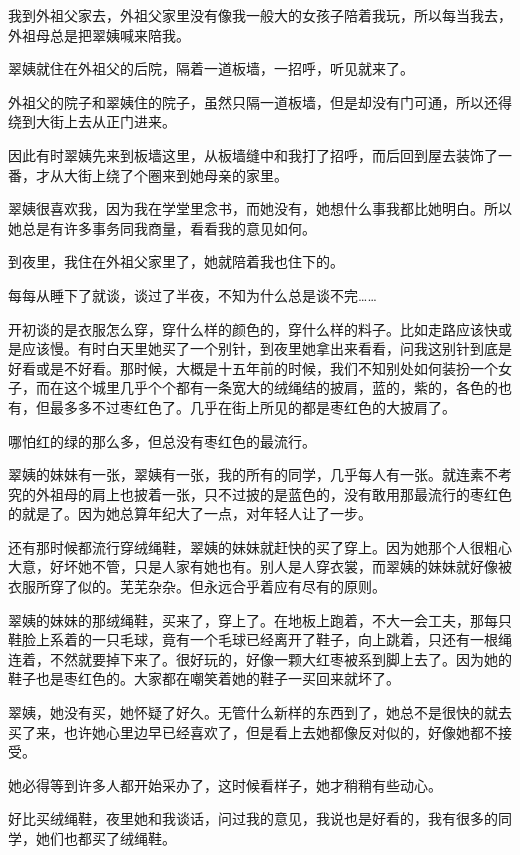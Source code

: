 \par 我到外祖父家去，外祖父家里没有像我一般大的女孩子陪着我玩，所以每当我去，外祖母总是把翠姨喊来陪我。
\par 翠姨就住在外祖父的后院，隔着一道板墙，一招呼，听见就来了。
\par 外祖父的院子和翠姨住的院子，虽然只隔一道板墙，但是却没有门可通，所以还得绕到大街上去从正门进来。
\par 因此有时翠姨先来到板墙这里，从板墙缝中和我打了招呼，而后回到屋去装饰了一番，才从大街上绕了个圈来到她母亲的家里。
\par 翠姨很喜欢我，因为我在学堂里念书，而她没有，她想什么事我都比她明白。所以她总是有许多事务同我商量，看看我的意见如何。
\par 到夜里，我住在外祖父家里了，她就陪着我也住下的。
\par 每每从睡下了就谈，谈过了半夜，不知为什么总是谈不完……
\par 开初谈的是衣服怎么穿，穿什么样的颜色的，穿什么样的料子。比如走路应该快或是应该慢。有时白天里她买了一个别针，到夜里她拿出来看看，问我这别针到底是好看或是不好看。那时候，大概是十五年前的时候，我们不知别处如何装扮一个女子，而在这个城里几乎个个都有一条宽大的绒绳结的披肩，蓝的，紫的，各色的也有，但最多多不过枣红色了。几乎在街上所见的都是枣红色的大披肩了。
\par 哪怕红的绿的那么多，但总没有枣红色的最流行。
\par 翠姨的妹妹有一张，翠姨有一张，我的所有的同学，几乎每人有一张。就连素不考究的外祖母的肩上也披着一张，只不过披的是蓝色的，没有敢用那最流行的枣红色的就是了。因为她总算年纪大了一点，对年轻人让了一步。
\par 还有那时候都流行穿绒绳鞋，翠姨的妹妹就赶快的买了穿上。因为她那个人很粗心大意，好坏她不管，只是人家有她也有。别人是人穿衣裳，而翠姨的妹妹就好像被衣服所穿了似的。芜芜杂杂。但永远合乎着应有尽有的原则。
\par 翠姨的妹妹的那绒绳鞋，买来了，穿上了。在地板上跑着，不大一会工夫，那每只鞋脸上系着的一只毛球，竟有一个毛球已经离开了鞋子，向上跳着，只还有一根绳连着，不然就要掉下来了。很好玩的，好像一颗大红枣被系到脚上去了。因为她的鞋子也是枣红色的。大家都在嘲笑着她的鞋子一买回来就坏了。
\par 翠姨，她没有买，她怀疑了好久。无管什么新样的东西到了，她总不是很快的就去买了来，也许她心里边早已经喜欢了，但是看上去她都像反对似的，好像她都不接受。
\par 她必得等到许多人都开始采办了，这时候看样子，她才稍稍有些动心。
\par 好比买绒绳鞋，夜里她和我谈话，问过我的意见，我说也是好看的，我有很多的同学，她们也都买了绒绳鞋。
